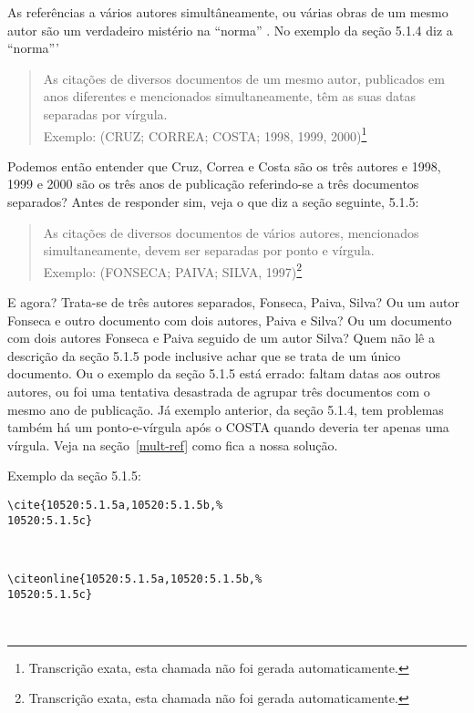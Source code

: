 \documentclass[espacosimples]{abnt}
\newcommand{\VerbL}{0.54\textwidth}
\newcommand{\LatL}{0.45\textwidth}
\begin{document}
As referências a vários autores simultâneamente, ou várias obras de um
mesmo autor são um verdadeiro mistério na ``norma'' \cite{NBR10520:2001}.
No exemplo da seção 5.1.4 diz a ``norma'''
\begin{quote}
As citações de diversos documentos de um mesmo autor, publicados em anos diferentes
e mencionados simultaneamente, têm as suas datas separadas por vírgula.\\
Exemplo: (CRUZ; CORREA; COSTA; 1998, 1999, 2000)\footnote{Transcrição exata, esta
chamada não foi gerada automaticamente.}
\end{quote}
Podemos então entender que Cruz, Correa e Costa são os três autores e 1998, 1999
e 2000 são os três anos de publicação referindo-se a três documentos separados?
Antes de responder sim, veja o que diz a seção seguinte, 5.1.5:
\begin{quote}
As citações de diversos documentos de vários autores, mencionados simultaneamente,
devem ser separadas por ponto e vírgula.\\
Exemplo: (FONSECA; PAIVA; SILVA, 1997)\footnote{Transcrição exata, esta
chamada não foi gerada automaticamente.}
\end{quote}
E agora? Trata-se de três autores separados, Fonseca, Paiva, Silva? Ou um
autor Fonseca e outro documento com dois autores, Paiva e Silva? Ou um
documento com dois autores Fonseca e Paiva seguido de um autor Silva?
Quem não lê a descrição da seção 5.1.5 pode inclusive achar que se trata
de um único documento. Ou o exemplo da seção 5.1.5 está errado:
faltam datas aos outros autores, ou foi uma tentativa
desastrada de agrupar três documentos com o mesmo ano de publicação.
Já exemplo anterior, da seção 5.1.4,  tem problemas também
há um ponto-e-vírgula após o COSTA quando deveria ter apenas uma vírgula.
Veja na seção~\ref{mult-ref} como fica a nossa solução.

Exemplo da seção 5.1.5:\\
\noindent\begin{minipage}[t]{\VerbL}\small\begin{verbatim}
\cite{10520:5.1.5a,10520:5.1.5b,%
10520:5.1.5c}
\end{verbatim}\end{minipage}\begin{minipage}[t]{\LatL}\small
\cite{10520:5.1.5a,10520:5.1.5b,10520:5.1.5c}
\end{minipage}\vspace{5mm}\\
\noindent\begin{minipage}[t]{\VerbL}\small\begin{verbatim}
\citeonline{10520:5.1.5a,10520:5.1.5b,%
10520:5.1.5c}
\end{verbatim}\end{minipage}\begin{minipage}[t]{\LatL}\small
{}
\end{minipage}\vspace{5mm}\\
\end{document}
